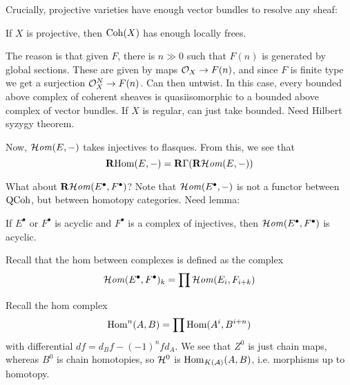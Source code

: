 Crucially, projective varieties have enough vector bundles to resolve any sheaf:

\begin{proposition}{}{}
    If $X$ is projective, then $\operatorname{Coh}(X)$ has enough locally frees.
\end{proposition}

The reason is that given $F$, there is $n\gg0$ such that $F(n)$ is generated by global sections. These are given by maps $\mathcal{O}_X\to F(n)$, and since $F$ is finite type we get a surjection $\mathcal{O}_X^N\to F(n)$. Can then untwist. In this case, every bounded above complex of coherent sheaves is quasiisomorphic to a bounded above complex of vector bundles. If $X$ is regular, can just take bounded. Need Hilbert syzygy theorem.




Now, $\operatorname{\mathcal{H}\mathit{om}}(E,-)$ takes injectives to flasques. From this, we see that
\begin{equation*}
    \operatorname{\mathbf{R} Hom}(E,-)=\operatorname{\mathbf{R}\Gamma}(\operatorname{\mathbf{R}\mathcal{H}\mathit{om}}(E,-))
\end{equation*}

What about $\operatorname{\mathbf{R}\mathcal{H}\mathit{om}}(E^\bullet, F^\bullet)$? Note that $\operatorname{\mathcal{H}\mathit{om}}(E^\bullet,-)$ is not a functor between $\operatorname{QCoh}$, but between homotopy categories. Need lemma:

\begin{lemma}{}{}
    If $E^\bullet$ or $F^\bullet$ is acyclic and $F^\bullet$ is a complex of injectives, then $\operatorname{\mathcal{H}\mathit{om}}(E^\bullet, F^\bullet)$ is acyclic.
\end{lemma}

Recall that the hom between complexes is defined as the complex
\begin{equation*}
    \operatorname{\mathcal{H}\mathit{om}}(E^\bullet, F^\bullet)_k = \prod\operatorname{\mathcal{H}\mathit{om}}(E_i,F_{i+k})
\end{equation*}

Recall the hom complex
\begin{equation*}
    \operatorname{Hom}^n(A,B) = \prod\operatorname{Hom}(A^i, B^{i+n})
\end{equation*}
with differential $df=d_Bf-(-1)^nfd_A$. We see that $Z^0$ is just chain maps, whereas $B^0$ is chain homotopies, so $\mathcal{H}^0$ is $\operatorname{Hom}_{K(\mathcal{A})}(A,B)$, i.e. morphisms up to homotopy.

